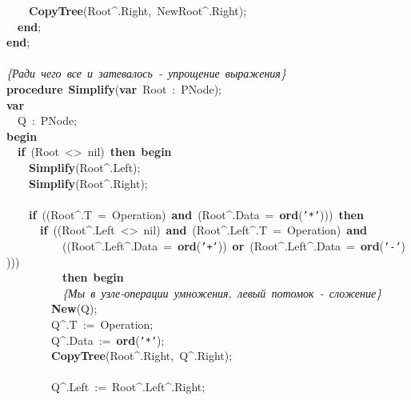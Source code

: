 \mbox{}\ \ \ \ \textbf{CopyTree}(Root\textasciicircum{}.Right,\ NewRoot\textasciicircum{}.Right); \\
\mbox{}\ \ \textbf{end}; \\
\mbox{}\textbf{end}; \\
\mbox{} \\
\mbox{}\textit{\{Ради\ чего\ все\ и\ затевалось\ -\ упрощение\ выражения\}} \\
\mbox{}\textbf{procedure}\ \textbf{Simplify}(\textbf{var}\ Root\ :\ PNode); \\
\mbox{}\textbf{var} \\
\mbox{}\ \ Q\ :\ PNode; \\
\mbox{}\textbf{begin} \\
\mbox{}\ \ \textbf{if}\ (Root\ \textless{}\textgreater{}\ nil)\ \textbf{then}\ \textbf{begin} \\
\mbox{}\ \ \ \ \textbf{Simplify}(Root\textasciicircum{}.Left); \\
\mbox{}\ \ \ \ \textbf{Simplify}(Root\textasciicircum{}.Right); \\
\mbox{} \\
\mbox{}\ \ \ \ \textbf{if}\ ((Root\textasciicircum{}.T\ =\ Operation)\ \textbf{and}\ (Root\textasciicircum{}.Data\ =\ \textbf{ord}(\texttt{'*'})))\ \textbf{then} \\
\mbox{}\ \ \ \ \ \ \textbf{if}\ ((Root\textasciicircum{}.Left\ \textless{}\textgreater{}\ nil)\ \textbf{and}\ (Root\textasciicircum{}.Left\textasciicircum{}.T\ =\ Operation)\ \textbf{and} \\
\mbox{}\ \ \ \ \ \ \ \ \ \ ((Root\textasciicircum{}.Left\textasciicircum{}.Data\ =\ \textbf{ord}(\texttt{'+'}))\ \textbf{or}\ (Root\textasciicircum{}.Left\textasciicircum{}.Data\ =\ \textbf{ord}(\texttt{'-'})))) \\
\mbox{}\ \ \ \ \ \ \ \ \ \ \textbf{then}\ \textbf{begin} \\
\mbox{}\ \ \ \ \ \ \ \ \ \ \textit{\{Мы\ в\ узле-операции\ умножения,\ левый\ потомок\ -\ сложение\}} \\
\mbox{}\ \ \ \ \ \ \ \ \textbf{New}(Q); \\
\mbox{}\ \ \ \ \ \ \ \ Q\textasciicircum{}.T\ :=\ Operation; \\
\mbox{}\ \ \ \ \ \ \ \ Q\textasciicircum{}.Data\ :=\ \textbf{ord}(\texttt{'*'}); \\
\mbox{}\ \ \ \ \ \ \ \ \textbf{CopyTree}(Root\textasciicircum{}.Right,\ Q\textasciicircum{}.Right); \\
\mbox{} \\
\mbox{}\ \ \ \ \ \ \ \ Q\textasciicircum{}.Left\ :=\ Root\textasciicircum{}.Left\textasciicircum{}.Right; \\
